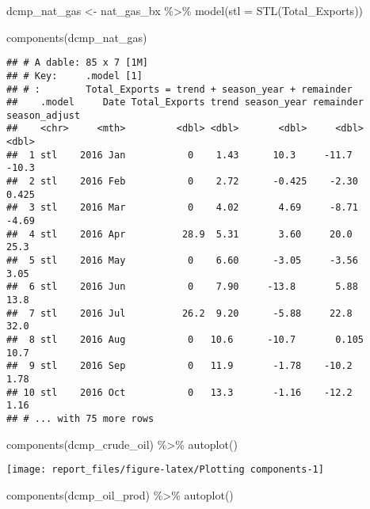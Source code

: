 \documentclass[
]{article}
\newenvironment{Shaded}{\begin{snugshade}}{\end{snugshade}}
\newcommand{\AttributeTok}[1]{\textcolor[rgb]{0.77,0.63,0.00}{#1}}
\newcommand{\FunctionTok}[1]{\textcolor[rgb]{0.00,0.00,0.00}{#1}}
\newcommand{\NormalTok}[1]{#1}
\newcommand{\OtherTok}[1]{\textcolor[rgb]{0.56,0.35,0.01}{#1}}
\newcommand{\SpecialCharTok}[1]{\textcolor[rgb]{0.00,0.00,0.00}{#1}}
\begin{document}
\begin{Shaded}
\begin{Highlighting}[]
\NormalTok{dcmp\_nat\_gas }\OtherTok{\textless{}{-}}\NormalTok{ nat\_gas\_bx }\SpecialCharTok{\%\textgreater{}\%}
  \FunctionTok{model}\NormalTok{(}\AttributeTok{stl =} \FunctionTok{STL}\NormalTok{(Total\_Exports))}

\FunctionTok{components}\NormalTok{(dcmp\_nat\_gas)}
\end{Highlighting}
\end{Shaded}

\begin{verbatim}
## # A dable: 85 x 7 [1M]
## # Key:     .model [1]
## # :        Total_Exports = trend + season_year + remainder
##    .model     Date Total_Exports trend season_year remainder season_adjust
##    <chr>     <mth>         <dbl> <dbl>       <dbl>     <dbl>         <dbl>
##  1 stl    2016 Jan           0    1.43      10.3     -11.7         -10.3  
##  2 stl    2016 Feb           0    2.72      -0.425    -2.30          0.425
##  3 stl    2016 Mar           0    4.02       4.69     -8.71         -4.69 
##  4 stl    2016 Apr          28.9  5.31       3.60     20.0          25.3  
##  5 stl    2016 May           0    6.60      -3.05     -3.56          3.05 
##  6 stl    2016 Jun           0    7.90     -13.8       5.88         13.8  
##  7 stl    2016 Jul          26.2  9.20      -5.88     22.8          32.0  
##  8 stl    2016 Aug           0   10.6      -10.7       0.105        10.7  
##  9 stl    2016 Sep           0   11.9       -1.78    -10.2           1.78 
## 10 stl    2016 Oct           0   13.3       -1.16    -12.2           1.16 
## # ... with 75 more rows
\end{verbatim}

\begin{Shaded}
\begin{Highlighting}[]
\FunctionTok{components}\NormalTok{(dcmp\_crude\_oil) }\SpecialCharTok{\%\textgreater{}\%} \FunctionTok{autoplot}\NormalTok{()}
\end{Highlighting}
\end{Shaded}

\begin{center}\texttt{[image: report\_files/figure-latex/Plotting components-1]} \end{center}

\begin{Shaded}
\begin{Highlighting}[]
\FunctionTok{components}\NormalTok{(dcmp\_oil\_prod) }\SpecialCharTok{\%\textgreater{}\%} \FunctionTok{autoplot}\NormalTok{()}
\end{Highlighting}
\end{Shaded}
\end{document}
